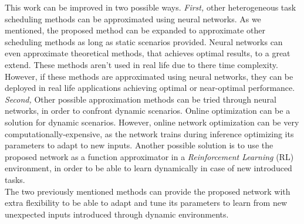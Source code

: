 This work can be improved in two possible ways. \emph{First,} other heterogeneous task scheduling methods can be approximated using neural networks. As we mentioned, the proposed method can be expanded to approximate other scheduling methods as long as static scenarios provided. Neural networks can even approximate theoretical methods, that achieves optimal results, to a great extend. These methods aren't used in real life due to there time complexity. However, if these methods are approximated using neural networks, they can be deployed in real life applications achieving optimal or near-optimal performance. \\ 

\emph{Second,} Other possible approximation methods can be tried through neural networks, in order to confront dynamic scenarios. Online optimization can be a solution for dynamic scenarios. However, online network optimization can be very computationally-expensive, as the network trains during inference optimizing its parameters to adapt to new inputs. Another possible solution is to use the proposed network as a function approximator in a \emph{Reinforcement Learning} (RL) environment, in order to be able to learn dynamically in case of new introduced tasks. \\

The two previously mentioned methods can provide the proposed network with extra flexibility to be able to adapt and tune its parameters to learn from new unexpected inputs introduced through dynamic environments. 

